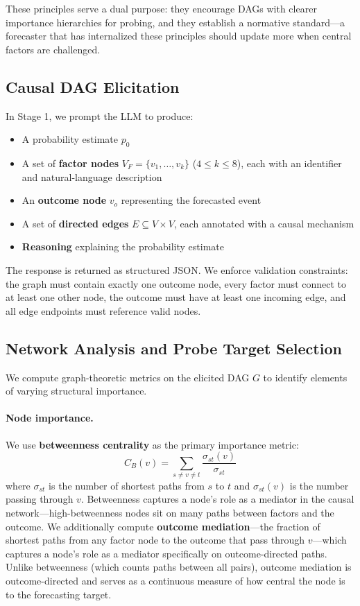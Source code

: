 \documentclass[11pt]{article}
\begin{document}
These principles serve a dual purpose: they encourage DAGs with clearer importance hierarchies for probing, and they establish a normative standard---a forecaster that has internalized these principles should update more when central factors are challenged.

\subsection{Causal DAG Elicitation}
\label{sec:dag}

In Stage 1, we prompt the LLM to produce:
\begin{itemize}
    \item A probability estimate $p_0$
    \item A set of \textbf{factor nodes} $V_F = \{v_1, \ldots, v_k\}$ ($4 \leq k \leq 8$), each with an identifier and natural-language description
    \item An \textbf{outcome node} $v_o$ representing the forecasted event
    \item A set of \textbf{directed edges} $E \subseteq V \times V$, each annotated with a causal mechanism
    \item \textbf{Reasoning} explaining the probability estimate
\end{itemize}

The response is returned as structured JSON. We enforce validation constraints: the graph must contain exactly one outcome node, every factor must connect to at least one other node, the outcome must have at least one incoming edge, and all edge endpoints must reference valid nodes.

\subsection{Network Analysis and Probe Target Selection}
\label{sec:network}

We compute graph-theoretic metrics on the elicited DAG $G$ to identify elements of varying structural importance.

\paragraph{Node importance.} We use \textbf{betweenness centrality} as the primary importance metric:
\begin{equation}
    C_B(v) = \sum_{s \neq v \neq t} \frac{\sigma_{st}(v)}{\sigma_{st}}
\end{equation}
where $\sigma_{st}$ is the number of shortest paths from $s$ to $t$ and $\sigma_{st}(v)$ is the number passing through $v$. Betweenness captures a node's role as a mediator in the causal network---high-betweenness nodes sit on many paths between factors and the outcome. We additionally compute \textbf{outcome mediation}---the fraction of shortest paths from any factor node to the outcome that pass through $v$---which captures a node's role as a mediator specifically on outcome-directed paths. Unlike betweenness (which counts paths between all pairs), outcome mediation is outcome-directed and serves as a continuous measure of how central the node is to the forecasting target.
\end{document}
